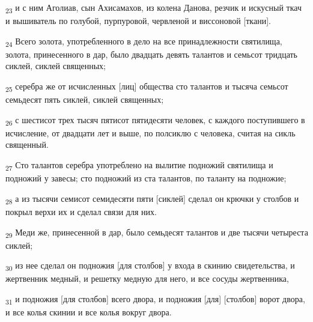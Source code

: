 \begin{tcolorbox}
\textsubscript{23} и с ним Аголиав, сын Ахисамахов, из колена Данова, резчик и искусный ткач и вышиватель по голубой, пурпуровой, червленой и виссоновой [ткани].
\end{tcolorbox}
\begin{tcolorbox}
\textsubscript{24} Всего золота, употребленного в дело на все принадлежности святилища, золота, принесенного в дар, было двадцать девять талантов и семьсот тридцать сиклей, сиклей священных;
\end{tcolorbox}
\begin{tcolorbox}
\textsubscript{25} серебра же от исчисленных [лиц] общества сто талантов и тысяча семьсот семьдесят пять сиклей, сиклей священных;
\end{tcolorbox}
\begin{tcolorbox}
\textsubscript{26} с шестисот трех тысяч пятисот пятидесяти человек, с каждого поступившего в исчисление, от двадцати лет и выше, по полсиклю с человека, считая на сикль священный.
\end{tcolorbox}
\begin{tcolorbox}
\textsubscript{27} Сто талантов серебра употреблено на вылитие подножий святилища и подножий у завесы; сто подножий из ста талантов, по таланту на подножие;
\end{tcolorbox}
\begin{tcolorbox}
\textsubscript{28} а из тысячи семисот семидесяти пяти [сиклей] сделал он крючки у столбов и покрыл верхи их и сделал связи для них.
\end{tcolorbox}
\begin{tcolorbox}
\textsubscript{29} Меди же, принесенной в дар, было семьдесят талантов и две тысячи четыреста сиклей;
\end{tcolorbox}
\begin{tcolorbox}
\textsubscript{30} из нее сделал он подножия [для столбов] у входа в скинию свидетельства, и жертвенник медный, и решетку медную для него, и все сосуды жертвенника,
\end{tcolorbox}
\begin{tcolorbox}
\textsubscript{31} и подножия [для столбов] всего двора, и подножия [для] [столбов] ворот двора, и все колья скинии и все колья вокруг двора.
\end{tcolorbox}
